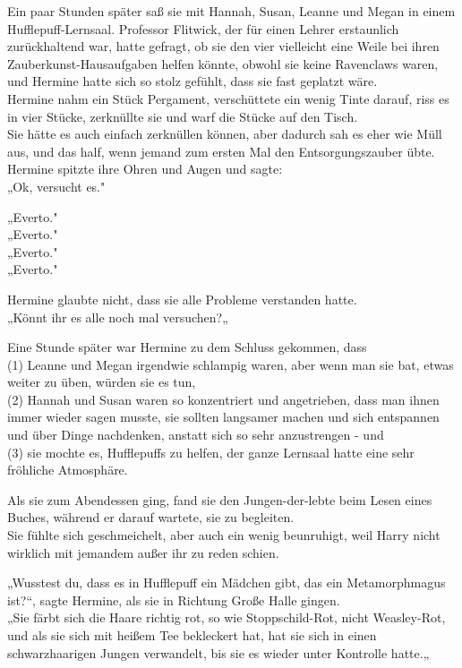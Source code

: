 {Ein paar Stunden später saß sie mit Hannah, Susan, Leanne und Megan in einem Hufflepuff-Lernsaal. Professor Flitwick, der für einen Lehrer erstaunlich zurückhaltend war, hatte gefragt, ob sie den vier vielleicht eine Weile bei ihren Zauberkunst-Hausaufgaben helfen könnte, obwohl sie keine Ravenclaws waren, und Hermine hatte sich so stolz gefühlt, dass sie fast geplatzt wäre.\\ Hermine nahm ein Stück Pergament, verschüttete ein wenig Tinte darauf, riss es in vier Stücke, zerknüllte sie und warf die Stücke auf den Tisch.\\ Sie hätte es auch einfach zerknüllen können, aber dadurch sah es eher wie Müll aus, und das half, wenn jemand zum ersten Mal den Entsorgungszauber übte.\\ Hermine spitzte ihre Ohren und Augen und sagte:\\ „Ok, versucht es."

„Everto."\\ „Everto."\\ „Everto."\\ „Everto."

Hermine glaubte nicht, dass sie alle Probleme verstanden hatte.\\ „Könnt ihr es alle noch mal versuchen?„

Eine Stunde später war Hermine zu dem Schluss gekommen, dass\\ (1) Leanne und Megan irgendwie schlampig waren, aber wenn man sie bat, etwas weiter zu üben, würden sie es tun,\\ (2) Hannah und Susan waren so konzentriert und angetrieben, dass man ihnen immer wieder sagen musste, sie sollten langsamer machen und sich entspannen und über Dinge nachdenken, anstatt sich so sehr anzustrengen - und\\ (3) sie mochte es, Hufflepuffs zu helfen, der ganze Lernsaal hatte eine sehr fröhliche Atmosphäre.

Als sie zum Abendessen ging, fand sie den Jungen-der-lebte beim Lesen eines Buches, während er darauf wartete, sie zu begleiten.\\ Sie fühlte sich geschmeichelt, aber auch ein wenig beunruhigt, weil Harry nicht wirklich mit jemandem außer ihr zu reden schien.

„Wusstest du, dass es in Hufflepuff ein Mädchen gibt, das ein Metamorphmagus ist?“, sagte Hermine, als sie in Richtung Große Halle gingen.\\ „Sie färbt sich die Haare richtig rot, so wie Stoppschild-Rot, nicht Weasley-Rot, und als sie sich mit heißem Tee bekleckert hat, hat sie sich in einen schwarzhaarigen Jungen verwandelt, bis sie es wieder unter Kontrolle hatte.„

}
